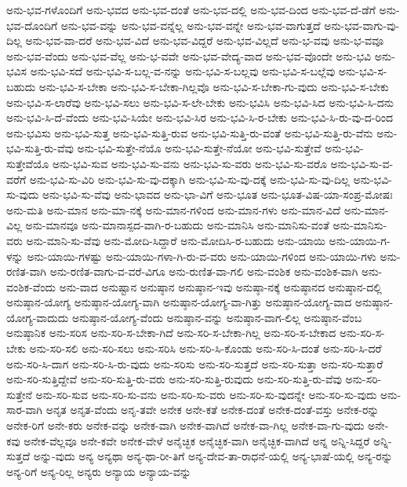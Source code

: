 {ಅನು-ಭವ-ಗಳೊಂದಿಗೆ
ಅನು-ಭವದ
ಅನು-ಭವ-ದಂತೆ
ಅನು-ಭವ-ದಲ್ಲಿ
ಅನು-ಭವ-ದಿಂದ
ಅನು-ಭವ-ದೆ-ಡೆಗೆ
ಅನು-ಭವ-ದೊಂದಿಗೆ
ಅನು-ಭವ-ವನ್ನು
ಅನು-ಭವ-ವನ್ನೆಲ್ಲ
ಅನು-ಭವ-ವನ್ನೇ
ಅನು-ಭವ-ವಾಗುತ್ತದೆ
ಅನು-ಭವ-ವಾಗು-ವು-ದಿಲ್ಲ
ಅನು-ಭವ-ವಾ-ದರೆ
ಅನು-ಭವ-ವಿದೆ
ಅನು-ಭವ-ವಿದ್ದರೆ
ಅನು-ಭವ-ವಿಲ್ಲದೆ
ಅನು-ಭ-ವವು
ಅನು-ಭ-ವವೂ
ಅನು-ಭವ-ವೆಂದು
ಅನು-ಭವ-ವೆಲ್ಲ
ಅನು-ಭ-ವವೇ
ಅನು-ಭವ-ವೇದ್ಯ-ವಾದ
ಅನು-ಭವ-ವೊಂದೇ
ಅನು-ಭವಿ
ಅನು-ಭವಿಸ
ಅನು-ಭವಿ-ಸದೆ
ಅನು-ಭವಿ-ಸ-ಬಲ್ಲ-ವ-ನನ್ನು
ಅನು-ಭವಿ-ಸ-ಬಲ್ಲವು
ಅನು-ಭವಿ-ಸ-ಬಲ್ಲೆವು
ಅನು-ಭವಿ-ಸ-ಬಹುದು
ಅನು-ಭವಿ-ಸ-ಬೇಕಾ
ಅನು-ಭವಿ-ಸ-ಬೇಕಾ-ಗಿಲ್ಲವೊ
ಅನು-ಭವಿ-ಸ-ಬೇಕಾ-ಗು-ವುದು
ಅನು-ಭವಿ-ಸ-ಬೇಕು
ಅನು-ಭವಿ-ಸ-ಲಾರೆವು
ಅನು-ಭವಿ-ಸಲು
ಅನು-ಭವಿ-ಸ-ಲೇ-ಬೇಕು
ಅನು-ಭವಿಸಿ
ಅನು-ಭವಿ-ಸಿದ
ಅನು-ಭವಿ-ಸಿ-ದನು
ಅನು-ಭವಿ-ಸಿ-ದೆ-ವೆಂದು
ಅನು-ಭವಿ-ಸಿಯೇ
ಅನು-ಭವಿ-ಸಿರ
ಅನು-ಭವಿ-ಸಿ-ರ-ಬೇಕು
ಅನು-ಭವಿ-ಸಿ-ರು-ವು-ದ-ರಿಂದ
ಅನು-ಭವಿಸು
ಅನು-ಭವಿ-ಸುತ್ತ
ಅನು-ಭವಿ-ಸುತ್ತಿ-ರುವ
ಅನು-ಭವಿ-ಸುತ್ತಿ-ರು-ವಂತೆ
ಅನು-ಭವಿ-ಸುತ್ತಿ-ರು-ವೆನು
ಅನು-ಭವಿ-ಸುತ್ತಿ-ರು-ವೆವು
ಅನು-ಭವಿ-ಸುತ್ತೇ-ನೆಯೊ
ಅನು-ಭವಿ-ಸುತ್ತೇ-ನೆಯೋ
ಅನು-ಭವಿ-ಸುತ್ತೇವೆ
ಅನು-ಭವಿ-ಸುತ್ತೇವೆಯೊ
ಅನು-ಭವಿ-ಸುವ
ಅನು-ಭವಿ-ಸು-ವನು
ಅನು-ಭವಿ-ಸು-ವರು
ಅನು-ಭವಿ-ಸು-ವರೊ
ಅನು-ಭವಿ-ಸು-ವ-ವರೆಗೆ
ಅನು-ಭವಿ-ಸು-ವಿರಿ
ಅನು-ಭವಿ-ಸು-ವು-ದಕ್ಕಾಗಿ
ಅನು-ಭವಿ-ಸು-ವು-ದಕ್ಕೆ
ಅನು-ಭವಿ-ಸು-ವು-ದಿಲ್ಲ
ಅನು-ಭವಿ-ಸು-ವುದು
ಅನು-ಭವಿ-ಸು-ವೆವು
ಅನು-ಭಾವದ
ಅನು-ಭಾ-ವಿಗೆ
ಅನು-ಭೂತ
ಅನು-ಭೂತ-ವಿಷ-ಯಾ-ಸಂಪ್ರ-ಮೋಷಃ
ಅನು-ಮತಿ
ಅನು-ಮಾನ
ಅನು-ಮಾ-ನಕ್ಕೆ
ಅನು-ಮಾನ-ಗಳಿಂದ
ಅನು-ಮಾನ-ಗಳು
ಅನು-ಮಾನ-ವಿದೆ
ಅನು-ಮಾನ-ವಿಲ್ಲ
ಅನು-ಮಾನವೂ
ಅನು-ಮಾನಾಸ್ಪದ-ವಾಗಿ-ರ-ಬಹುದು
ಅನು-ಮಾನಿಸಿ
ಅನು-ಮಾನಿಸು-ವಂತೆ
ಅನು-ಮಾನಿಸು-ವರು
ಅನು-ಮಾನಿ-ಸು-ವೆವು
ಅನು-ಮೋದಿ-ಸಿದ್ದಾರೆ
ಅನು-ಮೋದಿಸಿ-ರ-ಬಹುದು
ಅನು-ಯಾಯಿ
ಅನು-ಯಾಯಿ-ಗ-ಳನ್ನು
ಅನು-ಯಾಯಿ-ಗಳಷ್ಟು
ಅನು-ಯಾಯಿ-ಗಳಾ-ಗಿ-ರು-ವ-ವರು
ಅನು-ಯಾಯಿ-ಗಳಿಂದ
ಅನು-ಯಾಯಿ-ಗಳು
ಅನು-ರಣಿತ-ವಾಗಿ
ಅನು-ರಣಿತ-ವಾಗು-ವ-ವರೆ-ವಿಗೂ
ಅನು-ರುಣಿತ-ವಾ-ಗಲಿ
ಅನು-ವಂಶಿಕ
ಅನು-ವಂಶಿಕ-ವಾಗಿ
ಅನು-ವಂಶಿಕ-ವೆಂದು
ಅನು-ವಾದ
ಅನುಷ್ಟಾನ
ಅನುಷ್ಠಾನ
ಅನುಷ್ಠಾನ-ಇವು
ಅನುಷ್ಠಾ-ನಕ್ಕೆ
ಅನುಷ್ಠಾನದ
ಅನುಷ್ಠಾನ-ದಲ್ಲಿ
ಅನುಷ್ಠಾನ-ಯೋಗ್ಯ
ಅನುಷ್ಠಾನ-ಯೋಗ್ಯ-ವಾಗಿ
ಅನುಷ್ಠಾನ-ಯೋಗ್ಯ-ವಾ-ಗಿತ್ತು
ಅನುಷ್ಠಾನ-ಯೋಗ್ಯ-ವಾದ
ಅನುಷ್ಠಾನ-ಯೋಗ್ಯ-ವಾದುದು
ಅನುಷ್ಠಾನ-ಯೋಗ್ಯ-ವೆಂದು
ಅನುಷ್ಠಾನ-ವನ್ನು
ಅನುಷ್ಠಾನ-ವಾಗ-ಲಿಲ್ಲ
ಅನುಷ್ಠಾನ-ವೆಂಬ
ಅನುಷ್ಠಾನಿಕ
ಅನು-ಸರಿಸ
ಅನು-ಸರಿ-ಸ-ಬೇಕಾ-ಗಿದೆ
ಅನು-ಸರಿ-ಸ-ಬೇಕಾ-ಗಿಲ್ಲ
ಅನು-ಸರಿ-ಸ-ಬೇಕಾದ
ಅನು-ಸರಿ-ಸ-ಬೇಕು
ಅನು-ಸರಿ-ಸಲಿ
ಅನು-ಸರಿ-ಸಲು
ಅನು-ಸರಿಸಿ
ಅನು-ಸರಿ-ಸಿ-ಕೊಂಡು
ಅನು-ಸರಿ-ಸಿ-ದಂತೆ
ಅನು-ಸರಿ-ಸಿ-ದರೆ
ಅನು-ಸರಿ-ಸಿ-ದಾಗ
ಅನು-ಸರಿ-ಸಿ-ರು-ವುದು
ಅನು-ಸರಿಸು
ಅನು-ಸರಿ-ಸುತ್ತದೆ
ಅನು-ಸರಿ-ಸುತ್ತಾ
ಅನು-ಸರಿ-ಸುತ್ತಾರೆ
ಅನು-ಸರಿ-ಸುತ್ತಿದ್ದೇವೆ
ಅನು-ಸರಿ-ಸುತ್ತಿ-ರು-ವರು
ಅನು-ಸರಿ-ಸುತ್ತಿ-ರುವುದು
ಅನು-ಸರಿ-ಸುತ್ತಿ-ರು-ವೆವು
ಅನು-ಸರಿ-ಸುತ್ತೇನೆ
ಅನು-ಸರಿ-ಸುವ
ಅನು-ಸರಿ-ಸು-ವನು
ಅನು-ಸರಿ-ಸು-ವರು
ಅನು-ಸರಿ-ಸು-ವುದನ್ನೇ
ಅನು-ಸರಿ-ಸು-ವುದು
ಅನು-ಸಾರ-ವಾಗಿ
ಅನೃತ
ಅನೃತ-ವೆಂದು
ಅನೃ-ತವೇ
ಅನೇಕ
ಅನೇ-ಕತೆ
ಅನೇಕ-ದಂತೆ
ಅನೇಕ-ದಂತೆ-ವಸ್ತು
ಅನೇಕ-ರನ್ನು
ಅನೇಕ-ರಿಗೆ
ಅನೇ-ಕರು
ಅನೇಕ-ವನ್ನು
ಅನೇಕ-ವಾಗಿ
ಅನೇಕ-ವಾಗಿದೆ
ಅನೇಕ-ವಾ-ಗಿಲ್ಲ
ಅನೇಕ-ವಾ-ಗು-ವುದು
ಅನೇ-ಕವು
ಅನೇಕ-ವೆಲ್ಲವೂ
ಅನೇ-ಕವೇ
ಅನೇಕ-ವೇಳೆ
ಅನೈಚ್ಛಿಕ
ಅನೈಚ್ಛಿಕ-ವಾಗಿ
ಅನೈಚ್ಛಿಕ-ವಾಗಿದೆ
ಅನ್ನ
ಅನ್ನಿ-ಸಿದ್ದರೆ
ಅನ್ನಿ-ಸುತ್ತದೆ
ಅನ್ನು-ವುದು
ಅನ್ಯ
ಅನ್ಯಥಾ
ಅನ್ಯ-ಥಾ-ರೀ-ತಿಗೆ
ಅನ್ಯ-ದೇವ-ತಾ-ರಾಧನೆ-ಯಲ್ಲಿ
ಅನ್ಯ-ಭಾಷೆ-ಯಲ್ಲಿ
ಅನ್ಯ-ರನ್ನು
ಅನ್ಯ-ರಿಗೆ
ಅನ್ಯ-ರಿಲ್ಲ
ಅನ್ಯರು
ಅನ್ಯಾಯ
ಅನ್ಯಾಯ-ವನ್ನು
}
